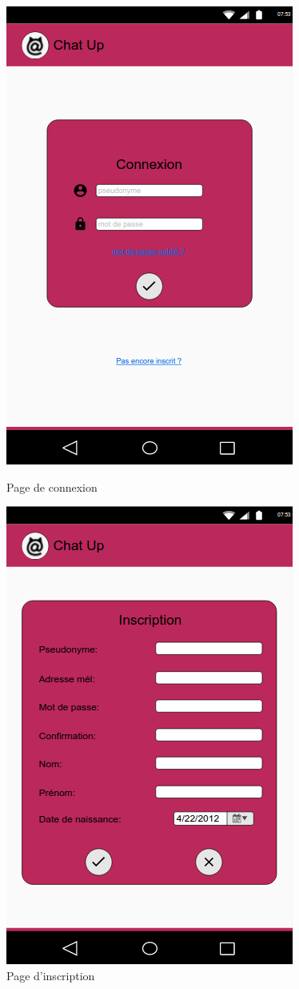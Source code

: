\begin{figure}[H]
   \begin{minipage}[c]{.46\linewidth}
      \includegraphics[scale=0.5]{img/SeConnecter.png}
      \caption{Page de connexion}
   \end{minipage} \hfill
   \begin{minipage}[c]{.46\linewidth}
      \includegraphics[scale=0.5]{img/CreerUnCompte.png}
      \caption{Page d'inscription}
   \end{minipage}
\end{figure}


